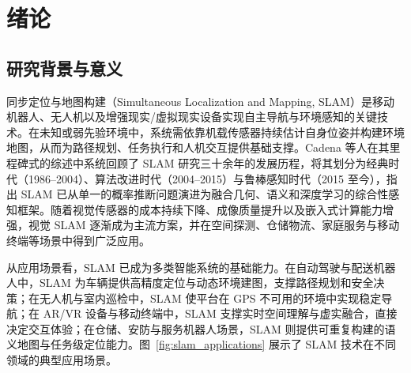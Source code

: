 \chapter{绪论}\label{chap:introduction}

\section{研究背景与意义}

同步定位与地图构建（Simultaneous Localization and Mapping, SLAM）是移动机器人、无人机以及增强现实/虚拟现实设备实现自主导航与环境感知的关键技术\cite{thrun2005probabilistic}。在未知或弱先验环境中，系统需依靠机载传感器持续估计自身位姿并构建环境地图，从而为路径规划、任务执行和人机交互提供基础支撑。Cadena 等人\cite{cadena2016past}在其里程碑式的综述中系统回顾了 SLAM 研究三十余年的发展历程，将其划分为经典时代（1986--2004）、算法改进时代（2004--2015）与鲁棒感知时代（2015 至今），指出 SLAM 已从单一的概率推断问题演进为融合几何、语义和深度学习的综合性感知框架。随着视觉传感器的成本持续下降、成像质量提升以及嵌入式计算能力增强，视觉 SLAM 逐渐成为主流方案\cite{gao2017vslam14}，并在空间探测、仓储物流、家庭服务与移动终端等场景中得到广泛应用。

从应用场景看，SLAM 已成为多类智能系统的基础能力。在自动驾驶与配送机器人中，SLAM 为车辆提供高精度定位与动态环境建图，支撑路径规划和安全决策；在无人机与室内巡检中，SLAM 使平台在 GPS 不可用的环境中实现稳定导航\cite{forster2014svo}；在 AR/VR 设备与移动终端中，SLAM 支撑实时空间理解与虚实融合，直接决定交互体验\cite{klein2007parallel}；在仓储、安防与服务机器人场景，SLAM 则提供可重复构建的语义地图与任务级定位能力。图~\ref{fig:slam_applications} 展示了 SLAM 技术在不同领域的典型应用场景。

